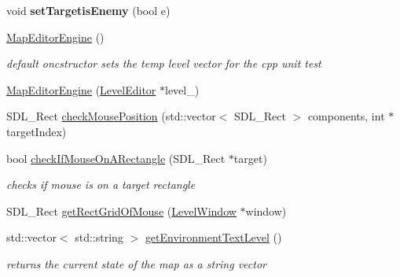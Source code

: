 \begin{DoxyCompactItemize}
\hypertarget{class_map_editor_engine_a902fa3f749da071354e6542900086b4e}{}\label{class_map_editor_engine_a902fa3f749da071354e6542900086b4e} 
void {\bfseries set\+Targetis\+Enemy} (bool e)
\item 
\hypertarget{class_map_editor_engine_a8706d14c1deff3ec54600ced37afa532}{}\label{class_map_editor_engine_a8706d14c1deff3ec54600ced37afa532} 
\hyperlink{class_map_editor_engine_a8706d14c1deff3ec54600ced37afa532}{Map\+Editor\+Engine} ()
\begin{DoxyCompactList}\small\item\em default oncstructor sets the temp level vector for the cpp unit test \end{DoxyCompactList}\item 
\hyperlink{class_map_editor_engine_ae709ea10e7b1a97a9178745793932ab4}{Map\+Editor\+Engine} (\hyperlink{class_level_editor}{Level\+Editor} $\ast$level\+\_\+)
\item 
S\+D\+L\+\_\+\+Rect \hyperlink{class_map_editor_engine_ab516d7b076e7353671374bf580211989}{check\+Mouse\+Position} (std\+::vector$<$ S\+D\+L\+\_\+\+Rect $>$ components, int $\ast$target\+Index)
\item 
\hypertarget{class_map_editor_engine_a749a28a30cd2d757bfa535f521cfcf71}{}\label{class_map_editor_engine_a749a28a30cd2d757bfa535f521cfcf71} 
bool \hyperlink{class_map_editor_engine_a749a28a30cd2d757bfa535f521cfcf71}{check\+If\+Mouse\+On\+A\+Rectangle} (S\+D\+L\+\_\+\+Rect $\ast$target)
\begin{DoxyCompactList}\small\item\em checks if mouse is on a target rectangle \end{DoxyCompactList}\item 
S\+D\+L\+\_\+\+Rect \hyperlink{class_map_editor_engine_a1e66d4cb755d33fb9ca29d6fa80b544a}{get\+Rect\+Grid\+Of\+Mouse} (\hyperlink{class_level_window}{Level\+Window} $\ast$window)
\item 
\hypertarget{class_map_editor_engine_af40cbaf29da36b57efef89175b4a2595}{}\label{class_map_editor_engine_af40cbaf29da36b57efef89175b4a2595} 
std\+::vector$<$ std\+::string $>$ \hyperlink{class_map_editor_engine_af40cbaf29da36b57efef89175b4a2595}{get\+Environment\+Text\+Level} ()
\begin{DoxyCompactList}\small\item\em returns the current state of the map as a string vector \end{DoxyCompactList}\item 
\hypertarget{class_map_editor_engine_a8e791a3027cb744fe72587f0d2521f97}{}\label{class_map_editor_engine_a8e791a3027cb744fe72587f0d2521f97} 

\end{DoxyCompactItemize}
